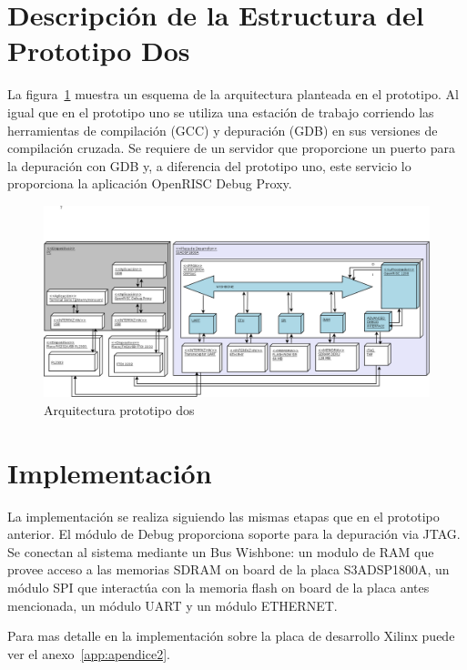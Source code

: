 		\section{Descripción de la Estructura del Prototipo Dos}
		La figura~\ref{fig:orpsoc} muestra un esquema de la arquitectura planteada en el prototipo. Al igual que en el prototipo uno se utiliza una estación
		de trabajo corriendo las herramientas de compilación (GCC) y depuración (GDB) en sus versiones de compilación cruzada. Se requiere de un servidor
		que proporcione un puerto para la depuración con GDB y, a diferencia del prototipo uno, este servicio lo proporciona la aplicación OpenRISC Debug
		Proxy.
		
		\begin{figure}[!h]
 		\begin{center}
  		\includegraphics[width=1.3\textwidth,keepaspectratio=true,angle=90]{./images/ORPSoCdia}
  		\caption{Arquitectura prototipo dos}
  		\label{fig:orpsoc} 
 		\end{center}
		\end{figure}
	
		\section{Implementación}

		La implementación se realiza siguiendo las mismas etapas que en el prototipo anterior. El módulo de Debug proporciona soporte para la depuración via JTAG. Se conectan al sistema mediante un Bus Wishbone: un modulo de RAM que provee
	acceso a las memorias SDRAM on board de la placa S3ADSP1800A, un módulo SPI que interactúa con la memoria flash on board de la placa antes
	mencionada, un módulo UART y un módulo ETHERNET.

Para mas detalle en la implementación sobre la placa de desarrollo Xilinx puede ver el anexo~\ref{app:apendice2}.
		

